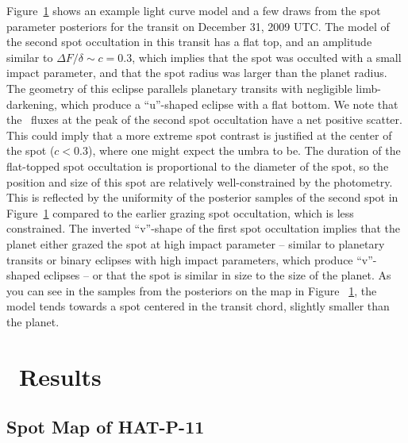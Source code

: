 \begin{figure}
\label{fig:transit_044}
\end{figure}


Figure~\ref{fig:transit_044} shows an example light curve model and a few draws from the spot parameter posteriors for the transit on December 31, 2009 UTC. The model of the second spot occultation in this transit has a flat top, and an amplitude similar to $\Delta F/ \delta \sim c = 0.3$, which implies that the spot was occulted with a small impact parameter, and that the spot radius was larger than the planet radius. The geometry of this eclipse parallels planetary transits with negligible limb-darkening, which produce a ``u''-shaped eclipse with a flat bottom. We note that the \kepler\ fluxes at the peak of the second spot occultation have a net positive scatter. This could imply that a more extreme spot contrast is justified at the center of the spot ($c<0.3$), where one might expect the umbra to be. The duration of the flat-topped spot occultation is proportional to the diameter of the spot, so the position and size of this spot are relatively well-constrained by the photometry. This is reflected by the uniformity of the posterior samples of the second spot in Figure~\ref{fig:transit_044} compared to the earlier grazing spot occultation, which is less constrained. The inverted ``v''-shape of the first spot occultation implies that the planet either grazed the spot at high impact parameter -- similar to planetary transits or binary eclipses with high impact parameters, which produce ``v''-shaped eclipses -- or that the spot is similar in size to the size of the planet. As you can see in the samples from the posteriors on the map in Figure~ \ref{fig:transit_044}, the model tends towards a spot centered in the transit chord, slightly smaller than the planet. 



\section{\stsp\ Results} \label{sec:results}
\subsection{Spot Map of HAT-P-11}

